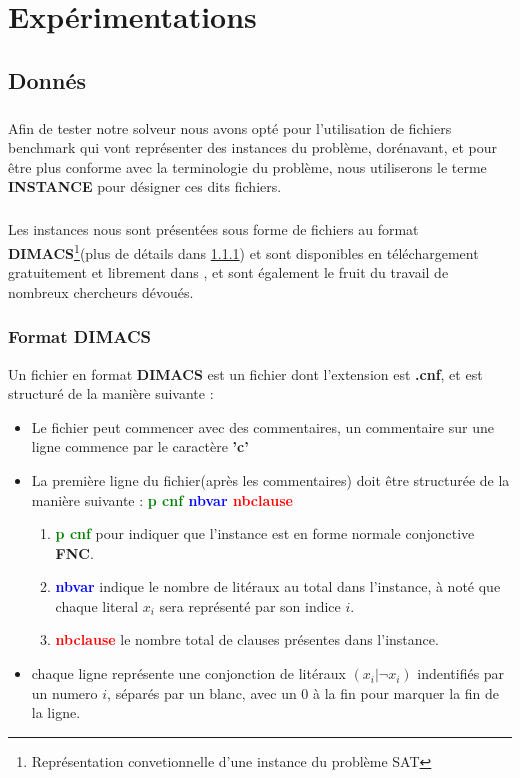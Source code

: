 \chapter{Expérimentations}
\section{Donnés}\label{dataSet}
\paragraph{}Afin de tester notre solveur nous avons opté pour l'utilisation de fichiers benchmark qui vont représenter des instances du problème, dorénavant, et pour être plus conforme avec la terminologie du problème, nous utiliserons le terme \textbf{INSTANCE} pour désigner ces dits fichiers.
\paragraph{}
Les instances nous sont présentées sous forme de fichiers au format \textbf{DIMACS}\footnote{Représentation convetionnelle d'une instance du problème SAT}(plus de détails dans \ref{par:dimacs}) et sont disponibles en téléchargement gratuitement et librement dans \cite{Benchmark}, et sont également le fruit du travail de nombreux chercheurs dévoués.
\subsection{Format DIMACS}\label{par:dimacs}
Un fichier en format \textbf{DIMACS} est un fichier dont l'extension est \textbf{.cnf}, et est structuré de la manière suivante : \\
\begin{itemize}
	\item Le fichier peut commencer avec des commentaires, un commentaire sur une ligne commence par le caractère \textbf{'c'}
	\item La première ligne du fichier(après les commentaires) doit être structurée de la manière suivante : \textbf{\textcolor{green}{p cnf} \textcolor{blue}{nbvar} \textcolor{red}{nbclause}}
	\begin{enumerate}
		\item \textbf{\textcolor{green}{p cnf}} pour indiquer que l'instance est en forme normale conjonctive \textbf{FNC}.
		\item \textbf{\textcolor{blue}{nbvar}} indique le nombre de litéraux au total dans l'instance, à noté que chaque literal $x_{i}$ sera représenté par son indice $i$.
		\item \textbf{\textcolor{red}{nbclause}} le nombre total de clauses présentes dans l'instance.
	\end{enumerate}
	\item chaque ligne représente une conjonction de litéraux $(x_{i} \vert \lnot x_{i})$ indentifiés par un numero $i$, séparés par un blanc, avec un 0 à la fin pour marquer la fin de la ligne.
\end{itemize}
